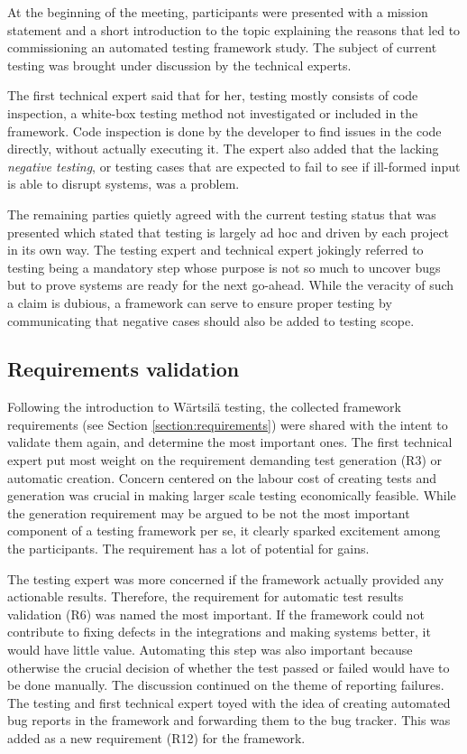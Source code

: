 \documentclass[12pt,a4paper,oneside,pdftex]{report}
\begin{document}
{At the beginning of the meeting, participants were presented with a mission statement and a short introduction to the topic explaining the reasons that led to commissioning an automated testing framework study. The subject of current testing was brought under discussion by the technical experts. 

The first technical expert said that for her, testing mostly consists of code inspection, a white-box testing method not investigated or included in the framework. Code inspection is done by the developer to find issues in the code directly, without actually executing it. The expert also added that the lacking \emph{negative testing}, or testing cases that are expected to fail to see if ill-formed input is able to disrupt systems, was a problem. 

The remaining parties quietly agreed with the current testing status that was presented which stated that testing is largely ad hoc and driven by each project in its own way. The testing expert and technical expert jokingly referred to testing being a mandatory step whose purpose is not so much to uncover bugs but to prove systems are ready for the next go-ahead. While the veracity of such a claim is dubious, a framework can serve to ensure proper testing by communicating that negative cases should also be added to testing scope.

\subsection{Requirements validation}

Following the introduction to Wärtsilä testing, the collected framework requirements (see Section \ref{section:requirements}) were shared with the intent to validate them again, and determine the most important ones. The first technical expert put most weight on the requirement demanding test generation (R3) or automatic creation. Concern centered on the labour cost of creating tests and generation was crucial in making larger scale testing economically feasible. While the generation requirement may be argued to be not the most important component of a testing framework per se, it clearly sparked excitement among the participants. The requirement has a lot of potential for gains.

The testing expert was more concerned if the framework actually provided any actionable results. Therefore, the requirement for automatic test results validation (R6) was named the most important. If the framework could not contribute to fixing defects in the integrations and making systems better, it would have little value. Automating this step was also important because otherwise the crucial decision of whether the test passed or failed would have to be done manually. The discussion continued on the theme of reporting failures. The testing and first technical expert toyed with the idea of creating automated bug reports in the framework and forwarding them to the bug tracker. This was added as a new requirement (R12) for the framework.

}
\end{document}
